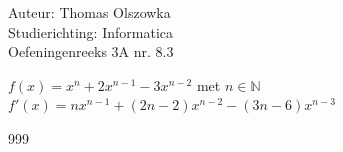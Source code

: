 \documentclass[a4paper]{article}
\begin{document}
\noindent \large Auteur: Thomas Olszowka \\
\noindent \large Studierichting: Informatica\\
\noindent \large Oefeningenreeks 3A nr. 8.3\\

\medskip

\normalsize

$f(x) = x^n + 2x^{n-1} -3x^{n-2}$ met $n \in \mathbb{N} $  \\

$f'(x) = nx^{n-1} + (2n-2)x^{n-2} - (3n-6)x^{n-3}$ \\

\begin{thebibliography}{999}
\end{thebibliography}
\end{document}

